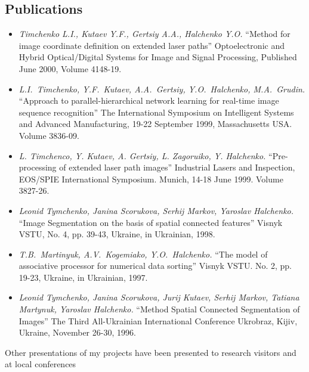 \documentclass[10pt,overlapped,line]{res}
\newcommand{\mtitle}[1]{``#1''}
\newcommand{\mauthors}[1]{ \textit{#1.}}
\newcommand{\mwhere}[1]{#1.}
\begin{document}
\begin{resume}
\section{Publications}

\begin{itemize}
 
 \item 
    \mauthors{Timchenko L.I., Kutaev Y.F., Gertsiy A.A., Halchenko Y.O}
    \mtitle{Method for image coordinate definition on extended laser paths} 
    \mwhere{Optoelectronic and Hybrid Optical/Digital Systems for Image and Signal Processing, Published June 2000,  Volume 4148-19}

 \item 
    \mauthors{L.I.\ Timchenko, Y.F.\ Kutaev, A.A.\ Gertsiy, Y.O.\ Halchenko,
    M.A.\ Grudin} 
    \mtitle{Approach to parallel-hierarchical network learning for real-time image sequence recognition} 
    \mwhere{The International Symposium on Intelligent Systems and Advanced Manufacturing, 19-22 September 1999, Massachusetts USA. Volume 3836-09}

  \item 
    \mauthors{L. Timchenco, Y. Kutaev, A. Gertsiy, L. Zagoruiko, Y. Halchenko} 
    \mtitle{Pre-processing of extended laser path images} 
    \mwhere{Industrial Lasers and Inspection, EOS/SPIE International Symposium. Munich, 14-18 June 1999. Volume 3827-26}

  \item 
    \mauthors{Leonid Tymchenko, Janina Scorukova, Serhij Markov, Yaroslav Halchenko} 
    \mtitle{Image Segmentation on the basis of spatial connected features} 
    \mwhere{Visnyk VSTU, No. 4, pp. 39-43, Ukraine, in Ukrainian, 1998}

  \item 
    \mauthors{T.B.\ Martinyuk, A.V.\ Kogemiako, Y.O.\ Halchenko} 
    \mtitle{The model of associative processor for numerical data sorting} 
    \mwhere{ Visnyk VSTU. No. 2, pp. 19-23, Ukraine, in Ukrainian, 1997}

  \item 
    \mauthors{Leonid Tymchenko, Janina Scorukova, Jurij Kutaev, Serhij Markov, Tatiana Martynuk, Yaroslav Halchenko} 
    \mtitle{Method Spatial Connected Segmentation of Images}
    \mwhere{The Third All-Ukrainian International Conference Ukrobraz, Kijiv, Ukraine, November 26-30, 1996}
\end{itemize}

Other presentations of my projects have been presented to research visitors and at local conferences


\end{resume}
\end{document}
